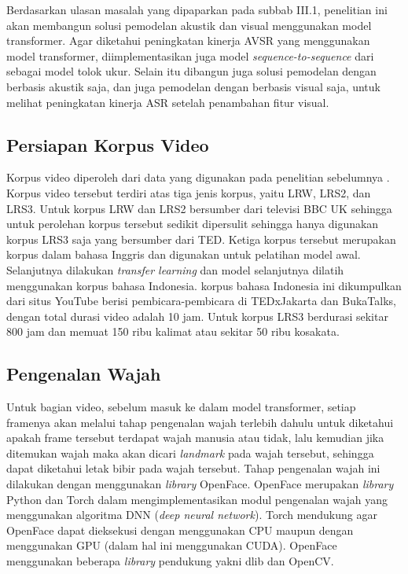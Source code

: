 Berdasarkan ulasan masalah yang dipaparkan pada subbab III.1, penelitian ini akan membangun solusi pemodelan akustik dan visual menggunakan model transformer. Agar diketahui peningkatan kinerja AVSR yang menggunakan model transformer, diimplementasikan juga model \textit{sequence-to-sequence} dari \textcite{Chung2017} sebagai model tolok ukur. Selain itu dibangun juga solusi pemodelan dengan berbasis akustik saja, dan juga pemodelan dengan berbasis visual saja, untuk melihat peningkatan kinerja ASR setelah penambahan fitur visual.


\subsection{Persiapan Korpus Video}
\label{subsec:korpus}

Korpus video diperoleh dari data yang digunakan pada penelitian sebelumnya \textcite{Chung2017}. Korpus video tersebut terdiri atas tiga jenis korpus, yaitu LRW, LRS2, dan LRS3. Untuk korpus LRW dan LRS2 bersumber dari televisi BBC UK sehingga untuk perolehan korpus tersebut sedikit dipersulit sehingga hanya digunakan korpus LRS3 saja yang bersumber dari TED. Ketiga korpus tersebut merupakan korpus dalam bahasa Inggris dan digunakan untuk pelatihan model awal. Selanjutnya dilakukan \textit{transfer learning} dan model selanjutnya dilatih menggunakan korpus bahasa Indonesia. korpus bahasa Indonesia ini dikumpulkan dari situs YouTube berisi pembicara-pembicara di TEDxJakarta dan BukaTalks, dengan total durasi video adalah 10 jam. Untuk korpus LRS3 berdurasi sekitar 800 jam dan memuat 150 ribu kalimat atau sekitar 50 ribu kosakata.

\subsection{Pengenalan Wajah}

Untuk bagian video, sebelum masuk ke dalam model transformer, setiap framenya akan melalui tahap pengenalan wajah terlebih dahulu untuk diketahui apakah frame tersebut terdapat wajah manusia atau tidak, lalu kemudian jika ditemukan wajah maka akan dicari \textit{landmark} pada wajah tersebut, sehingga dapat diketahui letak bibir pada wajah tersebut. Tahap pengenalan wajah ini dilakukan dengan menggunakan \textit{library} OpenFace. OpenFace merupakan \textit{library} Python dan Torch dalam mengimplementasikan modul pengenalan wajah yang menggunakan algoritma DNN (\textit{deep neural network}). Torch mendukung agar OpenFace dapat dieksekusi dengan menggunakan CPU maupun dengan menggunakan GPU (dalam hal ini menggunakan CUDA). OpenFace menggunakan beberapa \textit{library} pendukung yakni dlib dan OpenCV.

